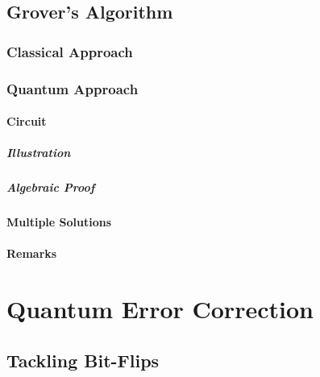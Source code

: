 	\section{Grover's Algorithm} %

		\subsection{Classical Approach} %

		\subsection{Quantum Approach} %

			\subsubsection{Circuit} %

				\paragraph{Illustration} %

				\paragraph{Algebraic Proof} %

			\subsubsection{Multiple Solutions} %

			\subsubsection{Remarks} %

\chapter{Quantum Error Correction} %

	\section{Tackling Bit-Flips} %

